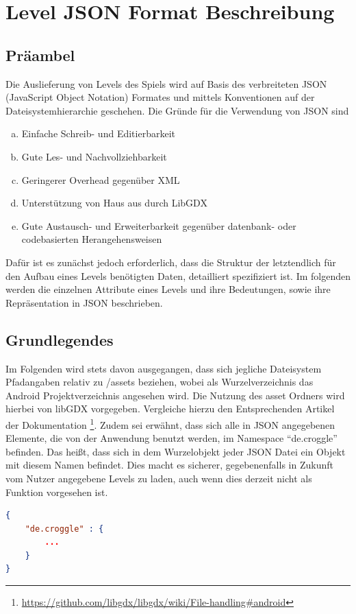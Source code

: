 
\chapter{Level JSON Format Beschreibung}
\section{Präambel}
Die Auslieferung von Levels des Spiels wird auf Basis des verbreiteten JSON (JavaScript Object Notation) Formates und mittels Konventionen auf der Dateisystemhierarchie geschehen.
Die Gründe für die Verwendung von JSON sind
\begin{enumerate}[a)]
	\item Einfache Schreib- und Editierbarkeit
	\item Gute Les- und Nachvollziehbarkeit
	\item Geringerer Overhead gegenüber XML
	\item Unterstützung von Haus aus durch LibGDX
	\item Gute Austausch- und Erweiterbarkeit gegenüber datenbank- oder codebasierten Herangehensweisen
\end{enumerate}
Dafür ist es zunächst jedoch erforderlich, dass die Struktur der letztendlich für den Aufbau eines Levels benötigten Daten, detailliert spezifiziert ist.
Im folgenden werden die einzelnen Attribute eines Levels und ihre Bedeutungen, sowie ihre Repräsentation in JSON beschrieben.

\section{Grundlegendes}
Im Folgenden wird stets davon ausgegangen, dass sich jegliche Dateisystem Pfadangaben relativ zu /assets beziehen, wobei als Wurzelverzeichnis das Android Projektverzeichnis angesehen wird.
Die Nutzung des asset Ordners wird hierbei von libGDX vorgegeben.
Vergleiche hierzu den Entsprechenden Artikel der Dokumentation \footnote{\url{https://github.com/libgdx/libgdx/wiki/File-handling\#android}}.
Zudem sei erwähnt, dass sich alle in JSON angegebenen Elemente, die von der Anwendung benutzt werden, im Namespace "`de.croggle"' befinden.
Das heißt, dass sich in dem Wurzelobjekt jeder JSON Datei ein Objekt mit diesem Namen befindet.
Dies macht es sicherer, gegebenenfalls in Zukunft vom Nutzer angegebene Levels zu laden, auch wenn dies derzeit nicht als Funktion vorgesehen ist.
\begin{lstlisting}[language=json,caption={Standardinhalt jeder JSON Datei der Anwendung}]
{
	"de.croggle" : {
		...
	}
}
\end{lstlisting}


